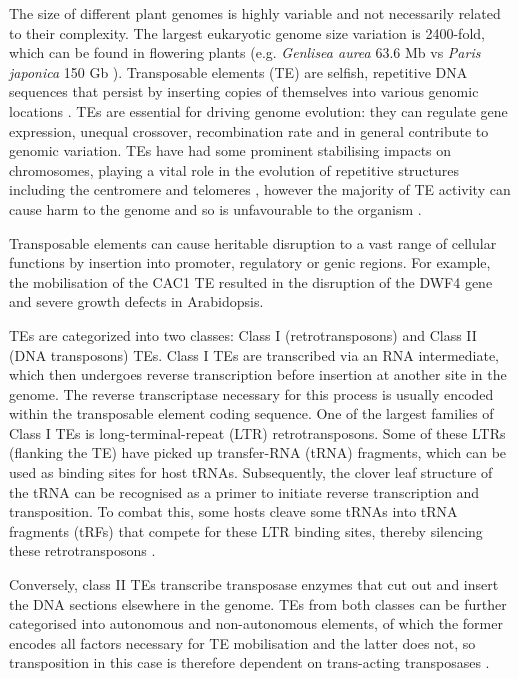 The size of different plant genomes is highly variable and not necessarily related to their complexity. The largest eukaryotic genome size variation is 2400-fold, which can be found in flowering plants (e.g. \textit{Genlisea aurea}  63.6 Mb vs \textit{Paris japonica} 150 Gb \citep{RN76,RN81}). Transposable elements (TE) are selfish, repetitive DNA sequences that persist by inserting copies of themselves into various genomic locations \citep{RN102}. TEs are essential for driving genome evolution:  they can regulate gene expression, unequal crossover, recombination rate and in general contribute to genomic variation. TEs have had some prominent stabilising impacts on  chromosomes, playing a vital role in the evolution  of repetitive structures including the centromere  and telomeres \citep{RN101}, however the majority of TE  activity can cause harm to the genome and so is unfavourable to the organism \citep{RN103}.

Transposable elements can cause heritable disruption to a vast range of cellular functions by insertion into promoter, regulatory or genic regions. For example, the mobilisation of the CAC1 TE resulted in the disruption of the DWF4 gene and severe growth defects in Arabidopsis.

TEs are categorized into two classes: Class I (retrotransposons) and Class II (DNA transposons) TEs. Class I TEs are transcribed via an RNA intermediate, which then undergoes reverse transcription before insertion at another site in the genome. The reverse transcriptase necessary for this process is usually encoded within the transposable element coding sequence. One of the largest families of Class I TEs is long-terminal-repeat (LTR) retrotransposons. Some of these LTRs (flanking the TE) have picked up transfer-RNA (tRNA) fragments, which can be used as binding sites for host tRNAs. Subsequently, the clover leaf structure of the tRNA can be recognised as a primer to initiate reverse transcription and transposition. To combat this, some hosts cleave some tRNAs into tRNA fragments (tRFs) that compete for these LTR binding sites, thereby silencing these retrotransposons \citep{RN66,RN67,RN68}.

Conversely, class II TEs transcribe transposase enzymes that cut out and insert the DNA sections elsewhere in the genome. TEs from both classes can be further categorised into autonomous and non-autonomous elements, of which the former encodes all factors necessary for TE mobilisation and the latter does not, so transposition in this case is therefore dependent on trans-acting transposases \citep{RN106,RN107}.

